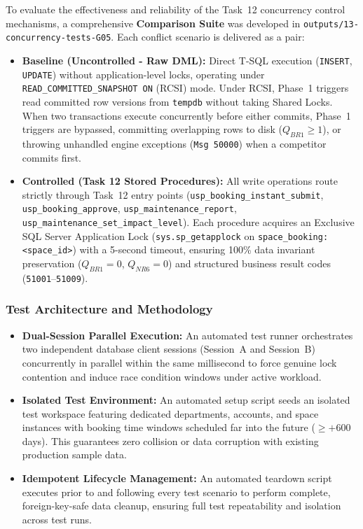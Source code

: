 To evaluate the effectiveness and reliability of the Task~12 concurrency control mechanisms, a comprehensive \textbf{Comparison Suite} was developed in \texttt{outputs/13-concurrency-tests-G05}. Each conflict scenario is delivered as a pair:
\begin{itemize}
    \item \textbf{Baseline (Uncontrolled - Raw DML):} Direct T-SQL execution (\texttt{INSERT}, \texttt{UPDATE}) without application-level locks, operating under \texttt{READ\_COMMITTED\_SNAPSHOT ON} (RCSI) mode. Under RCSI, Phase~1 triggers read committed row versions from \texttt{tempdb} without taking Shared Locks. When two transactions execute concurrently before either commits, Phase~1 triggers are bypassed, committing overlapping rows to disk ($Q_{BR1} \ge 1$), or throwing unhandled engine exceptions (\texttt{Msg 50000}) when a competitor commits first.
    \item \textbf{Controlled (Task 12 Stored Procedures):} All write operations route strictly through Task~12 entry points (\texttt{usp\_booking\_instant\_submit}, \texttt{usp\_booking\_approve}, \texttt{usp\_maintenance\_report}, \texttt{usp\_maintenance\_set\_impact\_level}). Each procedure acquires an Exclusive SQL Server Application Lock (\texttt{sys.sp\_getapplock} on \texttt{space\_booking:<space\_id>}) with a 5-second timeout, ensuring 100\% data invariant preservation ($Q_{BR1} = 0$, $Q_{NR6} = 0$) and structured business result codes (\texttt{51001}--\texttt{51009}).
\end{itemize}

\subsubsection{Test Architecture and Methodology}
\begin{itemize}
    \item \textbf{Dual-Session Parallel Execution:} An automated test runner orchestrates two independent database client sessions (Session~A and Session~B) concurrently in parallel within the same millisecond to force genuine lock contention and induce race condition windows under active workload.
    \item \textbf{Isolated Test Environment:} An automated setup script seeds an isolated test workspace featuring dedicated departments, accounts, and space instances with booking time windows scheduled far into the future ($\ge +600$ days). This guarantees zero collision or data corruption with existing production sample data.
    \item \textbf{Idempotent Lifecycle Management:} An automated teardown script executes prior to and following every test scenario to perform complete, foreign-key-safe data cleanup, ensuring full test repeatability and isolation across test runs.
\end{itemize}

